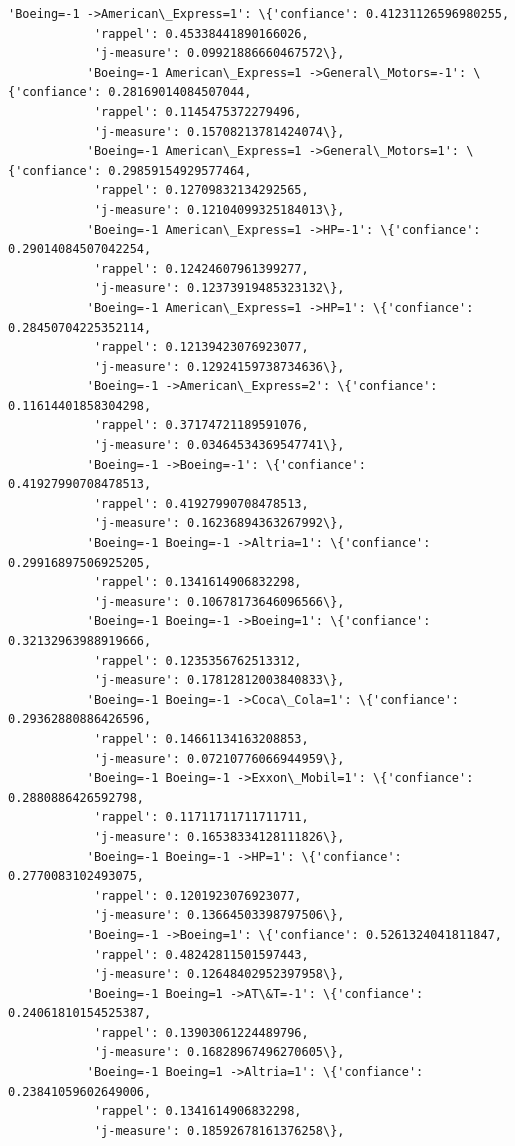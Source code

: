 \documentclass[11pt]{article}
\begin{document}
\begin{Verbatim}[commandchars=\\\{\}]
           'Boeing=-1 ->American\_Express=1': \{'confiance': 0.41231126596980255,
            'rappel': 0.45338441890166026,
            'j-measure': 0.09921886660467572\},
           'Boeing=-1 American\_Express=1 ->General\_Motors=-1': \{'confiance': 0.28169014084507044,
            'rappel': 0.1145475372279496,
            'j-measure': 0.15708213781424074\},
           'Boeing=-1 American\_Express=1 ->General\_Motors=1': \{'confiance': 0.29859154929577464,
            'rappel': 0.12709832134292565,
            'j-measure': 0.12104099325184013\},
           'Boeing=-1 American\_Express=1 ->HP=-1': \{'confiance': 0.29014084507042254,
            'rappel': 0.12424607961399277,
            'j-measure': 0.12373919485323132\},
           'Boeing=-1 American\_Express=1 ->HP=1': \{'confiance': 0.28450704225352114,
            'rappel': 0.12139423076923077,
            'j-measure': 0.12924159738734636\},
           'Boeing=-1 ->American\_Express=2': \{'confiance': 0.11614401858304298,
            'rappel': 0.37174721189591076,
            'j-measure': 0.03464534369547741\},
           'Boeing=-1 ->Boeing=-1': \{'confiance': 0.41927990708478513,
            'rappel': 0.41927990708478513,
            'j-measure': 0.16236894363267992\},
           'Boeing=-1 Boeing=-1 ->Altria=1': \{'confiance': 0.29916897506925205,
            'rappel': 0.1341614906832298,
            'j-measure': 0.10678173646096566\},
           'Boeing=-1 Boeing=-1 ->Boeing=1': \{'confiance': 0.32132963988919666,
            'rappel': 0.1235356762513312,
            'j-measure': 0.17812812003840833\},
           'Boeing=-1 Boeing=-1 ->Coca\_Cola=1': \{'confiance': 0.29362880886426596,
            'rappel': 0.14661134163208853,
            'j-measure': 0.07210776066944959\},
           'Boeing=-1 Boeing=-1 ->Exxon\_Mobil=1': \{'confiance': 0.2880886426592798,
            'rappel': 0.11711711711711711,
            'j-measure': 0.16538334128111826\},
           'Boeing=-1 Boeing=-1 ->HP=1': \{'confiance': 0.2770083102493075,
            'rappel': 0.1201923076923077,
            'j-measure': 0.13664503398797506\},
           'Boeing=-1 ->Boeing=1': \{'confiance': 0.5261324041811847,
            'rappel': 0.48242811501597443,
            'j-measure': 0.12648402952397958\},
           'Boeing=-1 Boeing=1 ->AT\&T=-1': \{'confiance': 0.24061810154525387,
            'rappel': 0.13903061224489796,
            'j-measure': 0.16828967496270605\},
           'Boeing=-1 Boeing=1 ->Altria=1': \{'confiance': 0.23841059602649006,
            'rappel': 0.1341614906832298,
            'j-measure': 0.18592678161376258\},

\end{Verbatim}
\end{document}
